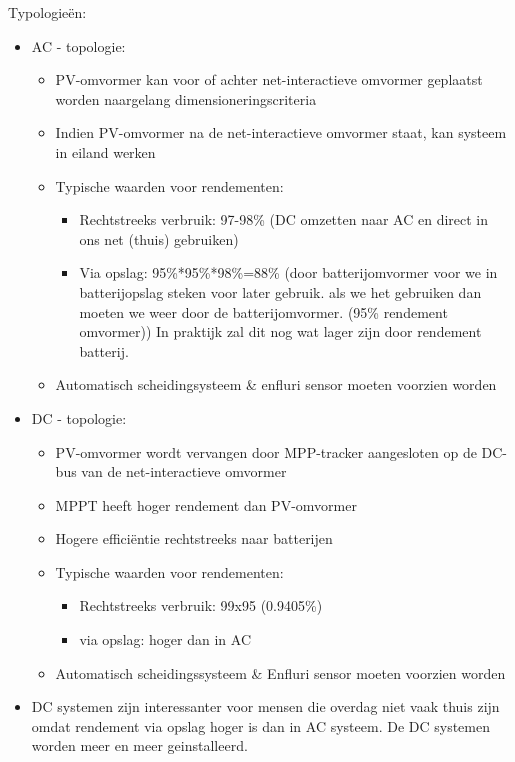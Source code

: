 \documentclass[12pt]{article}
\begin{document}
Typologieën:\begin{itemize}
    \item AC - topologie:\begin{itemize}
        \item PV-omvormer kan voor of achter net-interactieve omvormer
        geplaatst worden naargelang dimensioneringscriteria
        \item Indien PV-omvormer na de net-interactieve omvormer staat,
        kan systeem in eiland werken
        \item Typische waarden voor rendementen:\begin{itemize}
            \item Rechtstreeks verbruik: 97-98\% (DC omzetten naar AC en direct in ons net (thuis) gebruiken)
            \item Via opslag: 95\%*95\%*98\%=88\% (door batterijomvormer voor we in batterijopslag steken voor later gebruik. als we het gebruiken dan moeten we weer door de batterijomvormer. (95\% rendement omvormer)) In praktijk zal dit nog wat lager zijn door rendement batterij.
        \end{itemize}
        \item Automatisch scheidingsysteem \& enfluri sensor moeten voorzien worden
    \end{itemize}
    \item DC - topologie:\begin{itemize}
        \item PV-omvormer wordt vervangen door MPP-tracker aangesloten op de DC-bus van de net-interactieve omvormer
        \item MPPT heeft hoger rendement dan PV-omvormer
        \item Hogere efficiëntie rechtstreeks naar batterijen
        \item Typische waarden voor rendementen:\begin{itemize}
            \item Rechtstreeks verbruik: 99x95 (0.9405\%)
            \item via opslag: hoger dan in AC
        \end{itemize}
        \item Automatisch scheidingssysteem \& Enfluri
        sensor moeten voorzien worden
    \end{itemize}
    \item[] DC systemen zijn interessanter voor mensen die overdag niet vaak thuis zijn omdat rendement via opslag hoger is dan in AC systeem. De DC systemen worden meer en meer geinstalleerd.
\end{itemize}
\end{document}
